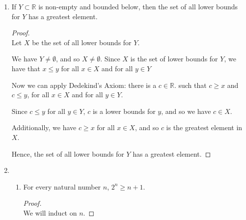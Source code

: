 \documentclass[12pt, letterpaper]{article}
\newcommand{\R}{\mathbb{R}}
\theoremstyle{definition} %
\begin{document}
\begin{enumerate}[label=\bfseries\arabic*.]
\begin{proof}
    Then, as proved in class, the product of two convergent sequences converges 
    to the product of their limits. And so 
    \begin{equation*}
        (x_n^k \cdot x)_{n \geq 1} \text{ converges to } L^k \cdot L \implies (x_n^{k+1})_{n \geq 1} \text{ converges to } L^{k+1}.
    \end{equation*}

    Hence, by induction, $(x_n^k)_{n \geq 1}$ converges to $L^k$.
\end{proof}

\item If $Y \subset \R$ is non-empty and bounded below, then the set of all 
lower bounds for $Y$ has a greatest element. 

\begin{proof} ~\\
    Let $X$ be the set of all lower bounds for $Y$. 

    We have $Y \neq \emptyset$, and so $X \neq \emptyset$. Since $X$ is the set of 
    lower bounds for $Y$, we have that $x \leq y$ for all $x \in X$ and for all 
    $y \in Y$ 

    Now we can apply Dedekind's Axiom: there is a $c \in \R$. such that 
    $c \geq x$ and $c \leq y$, for all $x \in X$ and for all $y \in Y$. 

    Since $c \leq y$ for all $y \in Y$, $c$ is a lower bounds for $y$, and so
    we have $c \in X$.

    Additionally, we have $c \geq x$ for all $x \in X$, and so $c$ is the 
    greatest element in $X$. 

    Hence, the set of all lower bounds for $Y$ has a greatest element. 
\end{proof}

\item
\begin{enumerate}[label=\bfseries(\alph*)]
    
    \item For every natural number $n$, $2^n \geq n+1$.
    \begin{proof} ~\\
        We will induct on $n$.


\end{proof}
\end{enumerate}
\end{enumerate}
\end{document}
